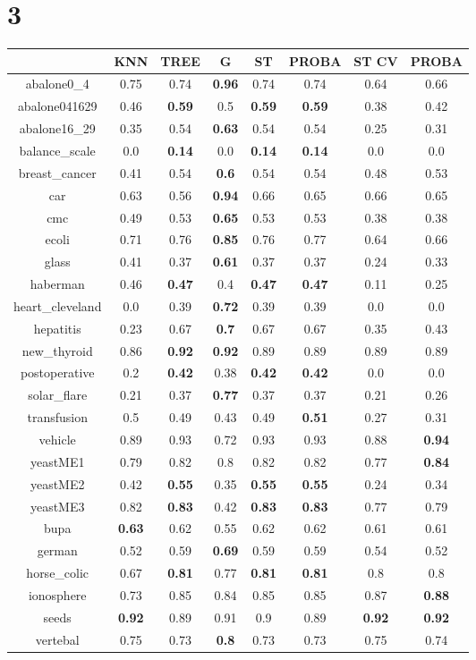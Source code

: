 \documentclass{article}%
\begin{document}
%
\section*{3}%
\begin{tabular}{c|ccccccc}%
\hline%
&KNN&TREE&G&ST&PROBA&ST CV&PROBA\\%
\hline%
abalone0\_4&0.75&0.74&\textbf{0.96}&0.74&0.74&0.64&0.66\\%
\hline%
abalone041629&0.46&\textbf{0.59}&0.5&\textbf{0.59}&\textbf{0.59}&0.38&0.42\\%
\hline%
abalone16\_29&0.35&0.54&\textbf{0.63}&0.54&0.54&0.25&0.31\\%
\hline%
balance\_scale&0.0&\textbf{0.14}&0.0&\textbf{0.14}&\textbf{0.14}&0.0&0.0\\%
\hline%
breast\_cancer&0.41&0.54&\textbf{0.6}&0.54&0.54&0.48&0.53\\%
\hline%
car&0.63&0.56&\textbf{0.94}&0.66&0.65&0.66&0.65\\%
\hline%
cmc&0.49&0.53&\textbf{0.65}&0.53&0.53&0.38&0.38\\%
\hline%
ecoli&0.71&0.76&\textbf{0.85}&0.76&0.77&0.64&0.66\\%
\hline%
glass&0.41&0.37&\textbf{0.61}&0.37&0.37&0.24&0.33\\%
\hline%
haberman&0.46&\textbf{0.47}&0.4&\textbf{0.47}&\textbf{0.47}&0.11&0.25\\%
\hline%
heart\_cleveland&0.0&0.39&\textbf{0.72}&0.39&0.39&0.0&0.0\\%
\hline%
hepatitis&0.23&0.67&\textbf{0.7}&0.67&0.67&0.35&0.43\\%
\hline%
new\_thyroid&0.86&\textbf{0.92}&\textbf{0.92}&0.89&0.89&0.89&0.89\\%
\hline%
postoperative&0.2&\textbf{0.42}&0.38&\textbf{0.42}&\textbf{0.42}&0.0&0.0\\%
\hline%
solar\_flare&0.21&0.37&\textbf{0.77}&0.37&0.37&0.21&0.26\\%
\hline%
transfusion&0.5&0.49&0.43&0.49&\textbf{0.51}&0.27&0.31\\%
\hline%
vehicle&0.89&0.93&0.72&0.93&0.93&0.88&\textbf{0.94}\\%
\hline%
yeastME1&0.79&0.82&0.8&0.82&0.82&0.77&\textbf{0.84}\\%
\hline%
yeastME2&0.42&\textbf{0.55}&0.35&\textbf{0.55}&\textbf{0.55}&0.24&0.34\\%
\hline%
yeastME3&0.82&\textbf{0.83}&0.42&\textbf{0.83}&\textbf{0.83}&0.77&0.79\\%
\hline%
bupa&\textbf{0.63}&0.62&0.55&0.62&0.62&0.61&0.61\\%
\hline%
german&0.52&0.59&\textbf{0.69}&0.59&0.59&0.54&0.52\\%
\hline%
horse\_colic&0.67&\textbf{0.81}&0.77&\textbf{0.81}&\textbf{0.81}&0.8&0.8\\%
\hline%
ionosphere&0.73&0.85&0.84&0.85&0.85&0.87&\textbf{0.88}\\%
\hline%
seeds&\textbf{0.92}&0.89&0.91&0.9&0.89&\textbf{0.92}&\textbf{0.92}\\%
\hline%
vertebal&0.75&0.73&\textbf{0.8}&0.73&0.73&0.75&0.74\\%
\hline%
\end{tabular}

%
\end{document}

